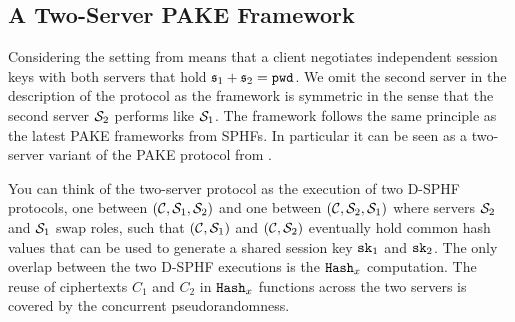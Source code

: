 
\subsection{A Two-Server PAKE Framework}
Considering the setting from \citet{Katz2012a} means that a client negotiates independent session keys with both servers that hold $\mathfrak{s}_1+\mathfrak{s}_2=\mathtt{pwd}$.
We omit the second server in the description of the protocol as the framework is symmetric in the sense that the second server $\mathcal{S}_2$ performs like $\mathcal{S}_1$.
The framework follows the same principle as the latest \ac{PAKE} frameworks from \acp{SPHF}.
In particular it can be seen as a two-server variant of the \ac{PAKE} protocol from \citet{Katz2011}.

You can think of the two-server protocol as the execution of two \ac{D-SPHF} protocols, one between $(\mathcal{C},\mathcal{S}_1,\mathcal{S}_2)$ and one between $(\mathcal{C},\mathcal{S}_2,\mathcal{S}_1)$ where servers $\mathcal{S}_2$ and $\mathcal{S}_1$ swap roles, such that $(\mathcal{C},\mathcal{S}_1)$ and $(\mathcal{C},\mathcal{S}_2)$ eventually hold common hash values that can be used to generate a shared session key $\mathtt{sk}_1$ and $\mathtt{sk}_2$.
The only overlap between the two \ac{D-SPHF} executions is the $\mathtt{Hash}_x$ computation.
The reuse of ciphertexts $C_1$ and $C_2$ in $\mathtt{Hash}_x$ functions across the two servers is covered by the concurrent pseudorandomness.

